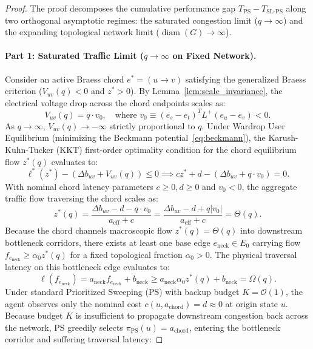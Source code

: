 \documentclass[11pt,a4paper]{article}
\begin{document}
\begin{proof}
The proof decomposes the cumulative performance gap $T_{\text{PS}} - T_{\text{SL-PS}}$ along two orthogonal asymptotic regimes: the saturated congestion limit ($q \to \infty$) and the expanding topological network limit ($\operatorname{diam}(G) \to \infty$).

\paragraph{Part 1: Saturated Traffic Limit ($q \to \infty$ on Fixed Network).}
Consider an active Braess chord $e^* = (u \to v)$ satisfying the generalized Braess criterion ($V_{uv}(q) < 0$ and $z^* > 0$). By Lemma~\ref{lem:scale_invariance}, the electrical voltage drop across the chord endpoints scales as:
\begin{equation}
V_{uv}(q) = q \cdot v_0, \quad \text{where } v_0 \equiv (e_s - e_t)^T L^+ (e_u - e_v) < 0.
\end{equation}
As $q \to \infty$, $V_{uv}(q) \to -\infty$ strictly proportional to $q$. Under Wardrop User Equilibrium (minimizing the Beckmann potential~\eqref{eq:beckmann}), the Karush-Kuhn-Tucker (KKT) first-order optimality condition for the chord equilibrium flow $z^*(q)$ evaluates to:
\begin{equation}
\ell^*(z^*) - (\Delta b_{uv} + V_{uv}(q)) \le 0 \implies c z^* + d - (\Delta b_{uv} + q \cdot v_0) = 0.
\end{equation}
With nominal chord latency parameters $c \ge 0, d \ge 0$ and $v_0 < 0$, the aggregate traffic flow traversing the chord scales as:
\begin{equation}
z^*(q) = \frac{\Delta b_{uv} - d - q \cdot v_0}{a_{\text{eff}} + c} = \frac{\Delta b_{uv} - d + q |v_0|}{a_{\text{eff}} + c} = \Theta(q).
\end{equation}
Because the chord channels macroscopic flow $z^*(q) = \Theta(q)$ into downstream bottleneck corridors, there exists at least one base edge $e_{\text{neck}} \in E_0$ carrying flow $f_{e_{\text{neck}}} \ge \alpha_0 z^*(q)$ for a fixed topological fraction $\alpha_0 > 0$. The physical traversal latency on this bottleneck edge evaluates to:
\begin{equation}
\ell(f_{e_{\text{neck}}}) = a_{\text{neck}} f_{e_{\text{neck}}} + b_{\text{neck}} \ge a_{\text{neck}} \alpha_0 z^*(q) + b_{\text{neck}} = \Omega(q).
\end{equation}
Under standard Prioritized Sweeping (PS) with backup budget $K = \mathcal{O}(1)$, the agent observes only the nominal cost $c(u, a_{\text{chord}}) = d \approx 0$ at origin state $u$. Because budget $K$ is insufficient to propagate downstream congestion back across the network, PS greedily selects $\pi_{\text{PS}}(u) = a_{\text{chord}}$, entering the bottleneck corridor and suffering traversal latency:

\end{proof}
\end{document}
